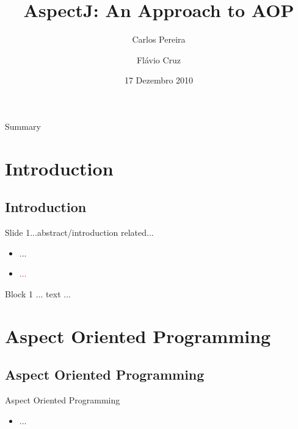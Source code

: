 \documentclass[11pt]{beamer}
\title{AspectJ: An Approach to AOP}
\author{Carlos Pereira \and Flávio Cruz}
\date{17 Dezembro 2010}
\institute[Source Code Analysis and Manipulation]{Source Code Analysis and Manipulation}
\begin{document}

\frame{\titlepage}


\section[Summary]{}
\subsection*{}
\begin{frame}{Summary}
  \tableofcontents
\end{frame}

\section{Introduction}
\subsection*{Introduction}

\begin{frame}{Slide 1...abstract/introduction related...}
\begin{itemize}
\item ...
\item \textcolor{red}{...}
\end{itemize}

\begin{block}{Block 1}  
... text ...
\end{block}
\end{frame}

\section{Aspect Oriented Programming}
\subsection*{Aspect Oriented Programming}

\begin{frame}{Aspect Oriented Programming}
\begin{itemize}
\item ...
\end{itemize}
\end{frame}
\end{document}

